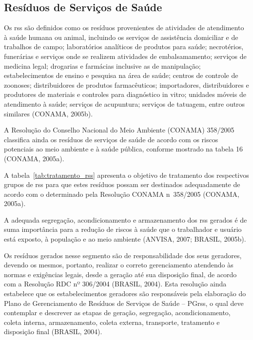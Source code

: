 	
	\subsection{Resíduos de Serviços de Saúde}
	Os \gls{rss} são definidos como os resíduos provenientes de atividades de atendimento à saúde humana ou animal, incluindo os serviços de assistência domiciliar e de trabalhos de campo; laboratórios analíticos de produtos para saúde; necrotérios, funerárias e serviços onde se realizem atividades de embalsamamento; serviços de medicina legal; drogarias e farmácias inclusive as de manipulação; estabelecimentos de ensino e pesquisa na área de saúde; centros de controle de zoonoses; distribuidores de produtos farmacêuticos; importadores, distribuidores e produtores de materiais e controles para diagnóstico in vitro; unidades móveis de atendimento à saúde; serviços de acupuntura; serviços de tatuagem, entre outros similares (CONAMA, 2005b).
	
	A Resolução do Conselho Nacional do Meio Ambiente (CONAMA) 358/2005 classifica ainda os resíduos de serviços de saúde de acordo com os riscos potenciais ao meio ambiente e à saúde pública, conforme mostrado na tabela 16 (CONAMA, 2005a).
	
	
	
	A tabela~\ref{tab:tratamento_rss} apresenta o objetivo de tratamento dos respectivos grupos de \gls{rss} para que estes resíduos possam ser destinados adequadamente de acordo com o determinado pela Resolução CONAMA n\textdegree\ 358/2005 (CONAMA, 2005a). %
	
	
	
	A adequada segregação, acondicionamento e armazenamento dos \gls{rss} gerados é de suma importância para a redução de riscos à saúde que o trabalhador e usuário está exposto, à população e ao meio ambiente (ANVISA, 2007; BRASIL, 2005b).
	
	Os resíduos gerados nesse segmento são de responsabilidade dos seus geradores, devendo os mesmos, portanto, realizar o correto gerenciamento atendendo às normas e exigências legais, desde a geração até sua disposição final, de acordo com a Resolução RDC nº 306/2004 (BRASIL, 2004). Esta resolução ainda estabelece que os estabelecimentos geradores são responsáveis pela elaboração do Plano de Gerenciamento de Resíduos de Serviços de Saúde – PG\gls{rss}, o qual deve contemplar e descrever as etapas de geração, segregação, acondicionamento, coleta interna, armazenamento, coleta externa, transporte, tratamento e disposição final (BRASIL, 2004).
	
